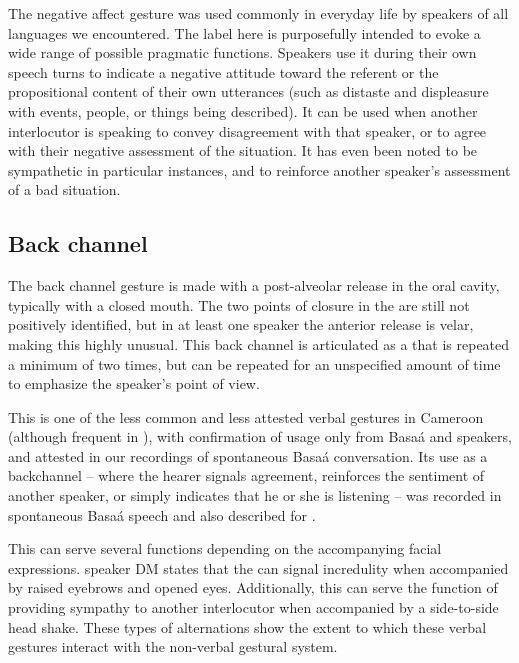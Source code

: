 \documentclass[output=paper,newtxmath,modfonts,nonflat,hidelinks]{langsci/langscibook}
\begin{document}


The negative affect gesture was used commonly in everyday life by speakers of all languages we encountered. The label here is purposefully intended to evoke a wide range of possible pragmatic functions. Speakers use it during their own speech turns to indicate a negative attitude toward the referent or the propositional content of their own utterances (such as distaste and displeasure with events, people, or things being described). It can be used when another interlocutor is speaking to convey disagreement with that speaker, or to agree with their negative assessment of the situation. It has even been noted to be sympathetic in particular instances, and to reinforce another speaker's assessment of a bad situation. %

\subsection{Back channel}

The back channel gesture is made with a post-alveolar release in the oral cavity, typically with a closed mouth. The two points of closure in the  are still not positively identified, but in at least one speaker the anterior release is velar, making this  highly unusual. This back channel is articulated as a  that is repeated a minimum of two times, but can be repeated for an unspecified amount of time to emphasize the speaker's point of view. 

This is one of the less common and less attested verbal gestures in Cameroon (although frequent in ), with confirmation of usage only from Basa\'a and  speakers, and attested in our recordings of spontaneous Basa\'{a} conversation. Its use as a backchannel -- where the hearer signals agreement, reinforces the sentiment of another speaker, or simply indicates that he or she is listening -- was recorded in spontaneous Basa\'{a} speech and also described for .

This  can serve several functions depending on the accompanying facial expressions.  speaker DM  states that the  can signal incredulity when accompanied by raised eyebrows and opened eyes. Additionally, this  can serve the function of providing sympathy to another interlocutor when accompanied by a side-to-side head shake. These types of alternations show the extent to which these verbal gestures interact with the non-verbal gestural system. 
\end{document}
